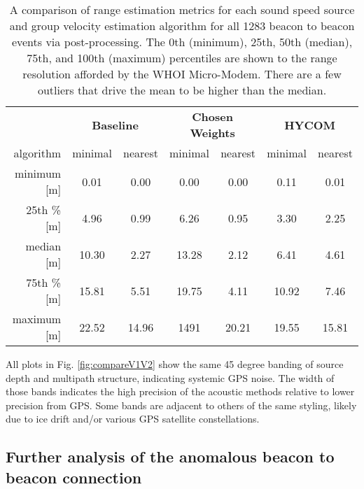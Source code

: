 \begin{table}[h!]
\renewcommand{\arraystretch}{1.5}
\centering
\begin{tabular}{r|cc|cc|cc}\toprule
 & \multicolumn{2}{c|}{\textbf{Baseline} } & \multicolumn{2}{c|}{\textbf{Chosen Weights} } & \multicolumn{2}{c}{\textbf{HYCOM}} \\
 algorithm & \cellcolor[HTML]{EFEFEF}minimal & nearest & \cellcolor[HTML]{EFEFEF} minimal& nearest & \cellcolor[HTML]{EFEFEF}minimal & nearest \\ \hline
 minimum [m] 	& \cellcolor[HTML]{EFEFEF}0.01 & 0.00	& \cellcolor[HTML]{EFEFEF}0.00 	& 0.00 	& \cellcolor[HTML]{EFEFEF}0.11 & 0.01 \\
 25th \% [m]   & \cellcolor[HTML]{EFEFEF}4.96 & 0.99	& \cellcolor[HTML]{EFEFEF}6.26 	& 0.95 	& \cellcolor[HTML]{EFEFEF}3.30 & 2.25 \\   
 median [m]		& \cellcolor[HTML]{EFEFEF}10.30 & 2.27 	& \cellcolor[HTML]{EFEFEF}13.28 & 2.12 	& \cellcolor[HTML]{EFEFEF}6.41 & 4.61 \\
 75th \% [m]   & \cellcolor[HTML]{EFEFEF}15.81 & 5.51 	& \cellcolor[HTML]{EFEFEF}19.75 & 4.11 	& \cellcolor[HTML]{EFEFEF}10.92 & 7.46 \\
 maximum [m]    & \cellcolor[HTML]{EFEFEF}22.52 & 14.96 & \cellcolor[HTML]{EFEFEF}1491  & 20.21 & \cellcolor[HTML]{EFEFEF}19.55 & 15.81 \\
 \toprule
\end{tabular}
\caption[Comparison of post-processing range estimation algorithms across all events]{A comparison of range estimation metrics for each sound speed source and group velocity estimation algorithm for all 1283 beacon to beacon events via post-processing. The 0th (minimum), 25th, 50th (median), 75th, and 100th (maximum) percentiles are shown to the range resolution afforded by the WHOI Micro-Modem. There are a few outliers that drive the mean to be higher than the median.}
\label{tab:rangeErrorV1V2}
\end{table}

All plots in Fig. \ref{fig:compareV1V2} show the same 45 degree banding of source depth and multipath structure, indicating systemic GPS noise.
The width of those bands indicates the high precision of the acoustic methods relative to lower precision from GPS.
Some bands are adjacent to others of the same styling, likely due to ice drift and/or various GPS satellite constellations.

\FloatBarrier
\subsection{Further analysis of the anomalous beacon to beacon connection}
\label{subsec:anomalousBeacon}

